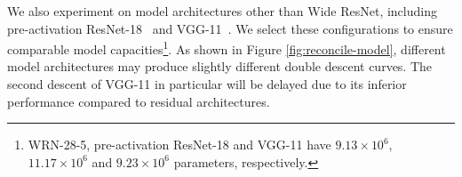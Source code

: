 


 We also experiment on model architectures other than Wide ResNet, including pre-activation ResNet-18~\citep{He2016IdentityMI} and VGG-11~\citep{Simonyan2015VeryDC}. We select these configurations to ensure comparable model capacities\footnote{WRN-28-5, pre-activation ResNet-18 and VGG-11 have $9.13\times 10^6$, $11.17\times 10^6$ and $9.23\times 10^6$ parameters, respectively.}. As shown in Figure \ref{fig:reconcile-model}, different model architectures may produce slightly different double descent curves. The second descent of VGG-11 in particular will be delayed due to its inferior performance compared to residual architectures.

